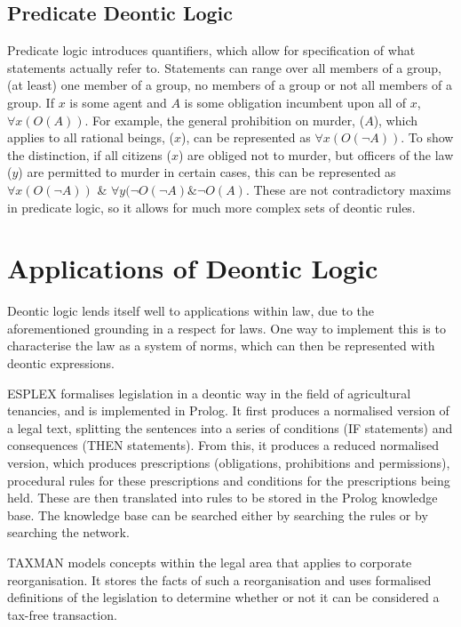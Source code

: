 \documentclass{l4proj}
\begin{document}
\subsection{Predicate Deontic Logic}
Predicate logic\cite{predicate} introduces quantifiers, which allow for specification of what statements actually refer to. Statements can range over all members of a group, (at least) one member of a group, no members of a group or not all members of a group. If $x$ is some agent and $A$ is some obligation incumbent upon all of $x$, \( \forall{x(O(A))} \). For example, the general prohibition on murder, ($A$), which applies to all rational beings, ($x$), can be represented as \( \forall{x(O( \neg A))} \). To show the distinction, if all citizens ($x$) are obliged not to murder, but officers of the law ($y$) are permitted to murder in certain cases, this can be represented as \( \forall{x(O( \neg A))} \) \& \( \forall{y( \neg O( \neg A) \& \neg O(A)} \). These are not contradictory maxims in predicate logic, so it allows for much more complex sets of deontic rules. 


\section{Applications of Deontic Logic}
Deontic logic lends itself well to applications within law, due to the aforementioned grounding in a respect for laws. One way to implement this is to characterise the law as a system of norms\cite{law-jonessergot}, which can then be represented with deontic expressions. 

ESPLEX formalises legislation in a deontic way in the field of agricultural tenancies\cite{ESPLEX}, and is implemented in Prolog. It first produces a normalised version of a legal text, splitting the sentences into a series of conditions (IF statements) and consequences (THEN statements). From this, it produces a reduced normalised version, which produces prescriptions (obligations, prohibitions and permissions), procedural rules for these prescriptions and conditions for the prescriptions being held. These are then translated into rules to be stored in the Prolog knowledge base. The knowledge base can be searched either by searching the rules or by searching the network.

TAXMAN models concepts within the legal area that applies to corporate reorganisation\cite{TAXMAN}. It stores the facts of such a reorganisation and uses formalised definitions of the legislation to determine whether or not it can be considered a tax-free transaction. 
\end{document}
